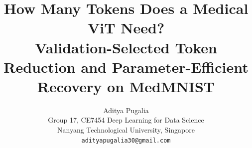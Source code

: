 \documentclass[10pt,twocolumn,letterpaper]{article}
\title{How Many Tokens Does a Medical ViT Need?\\
Validation-Selected Token Reduction and Parameter-Efficient Recovery on MedMNIST}
\author{Aditya Pugalia \qquad \TODO{Author 2} \qquad \TODO{Author 3}\\
Group 17, CE7454 Deep Learning for Data Science\\
Nanyang Technological University, Singapore\\
{\tt\small adityapugalia30@gmail.com}
}
\begin{document}
\maketitle






{
    \small
    
    
}

% 
\end{document}
